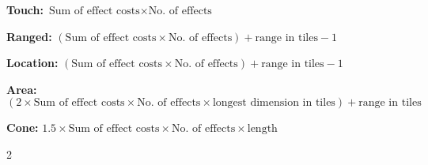 \begin{multicols*}{2}
    \noindent
    \textbf{Touch:} $\text{Sum of effect costs} \times \text{No. of effects}$

    \noindent
    \textbf{Ranged:} $(\text{Sum of effect costs} \times \text{No. of effects}) + \text{range in tiles} - 1$

    \noindent
    \textbf{Location:} $(\text{Sum of effect costs} \times \text{No. of effects}) + \text{range in tiles} - 1$

    \noindent
    \textbf{Area:} $(2 \times \text{Sum of effect costs} \times \text{No. of effects} \times \text{longest dimension in tiles}) + \text{range in tiles}$

    \noindent
    \textbf{Cone:} $1.5 \times \text{Sum of effect costs} \times \text{No. of effects} \times \text{length}$

\end{multicols*}{2}
